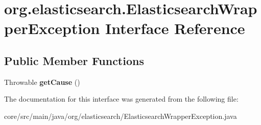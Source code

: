 \hypertarget{interfaceorg_1_1elasticsearch_1_1_elasticsearch_wrapper_exception}{}\section{org.\+elasticsearch.\+Elasticsearch\+Wrapper\+Exception Interface Reference}
\label{interfaceorg_1_1elasticsearch_1_1_elasticsearch_wrapper_exception}
\subsection*{Public Member Functions}
\begin{DoxyCompactItemize}
\item 
\hypertarget{interfaceorg_1_1elasticsearch_1_1_elasticsearch_wrapper_exception_a5a693d40d1da0d4a2304b6c23591b18f}{}\label{interfaceorg_1_1elasticsearch_1_1_elasticsearch_wrapper_exception_a5a693d40d1da0d4a2304b6c23591b18f} 
Throwable {\bfseries get\+Cause} ()
\end{DoxyCompactItemize}


The documentation for this interface was generated from the following file\+:\begin{DoxyCompactItemize}
\item 
core/src/main/java/org/elasticsearch/Elasticsearch\+Wrapper\+Exception.\+java\end{DoxyCompactItemize}
